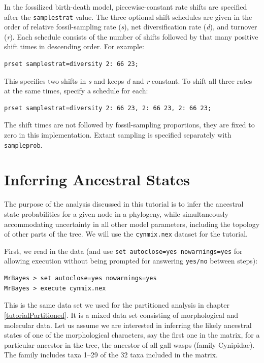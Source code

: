 \documentclass[12pt]{book}
\begin{document}
In the fossilized birth-death model, piecewise-constant rate shifts are specified after the
\texttt{samplestrat} value. The three optional shift schedules are given in the order of relative
fossil-sampling rate (\textit{s}), net diversification rate (\textit{d}), and turnover
(\textit{r}). Each schedule consists of the number of shifts followed by that many positive shift
times in descending order. For example:

\begin{Verbatim}
prset samplestrat=diversity 2: 66 23;
\end{Verbatim}

This specifies two shifts in \textit{s} and keeps \textit{d} and \textit{r} constant. To shift all
three rates at the same times, specify a schedule for each:

\begin{Verbatim}
prset samplestrat=diversity 2: 66 23, 2: 66 23, 2: 66 23;
\end{Verbatim}

The shift times are not followed by fossil-sampling proportions, they are fixed to zero in this
implementation. Extant sampling is specified separately with \texttt{sampleprob}.


\section{Inferring Ancestral States}

The purpose of the analysis discussed in this tutorial is to infer the ancestral state
probabilities for a given node in a phylogeny, while simultaneously accommodating uncertainty in
all other model parameters, including the topology of other parts of the tree. We will use the
\texttt{cynmix.nex} dataset for the tutorial.

First, we read in the data (and use \texttt{set autoclose=yes nowarnings=yes} for allowing
execution without being prompted for answering \texttt{yes/no} between steps):

\begin{Verbatim}
MrBayes > set autoclose=yes nowarnings=yes
MrBayes > execute cynmix.nex
\end{Verbatim}

This is the same data set we used for the partitioned analysis in chapter
\ref{tutorialPartitioned}. It is a mixed data set consisting of morphological and molecular data.
Let us assume we are interested in inferring the likely ancestral states of one of the
morphological characters, say the first one in the matrix, for a particular ancestor in the tree,
the ancestor of all gall wasps (family Cynipidae). The family includes taxa 1--29 of the 32 taxa
included in the matrix.
\end{document}
